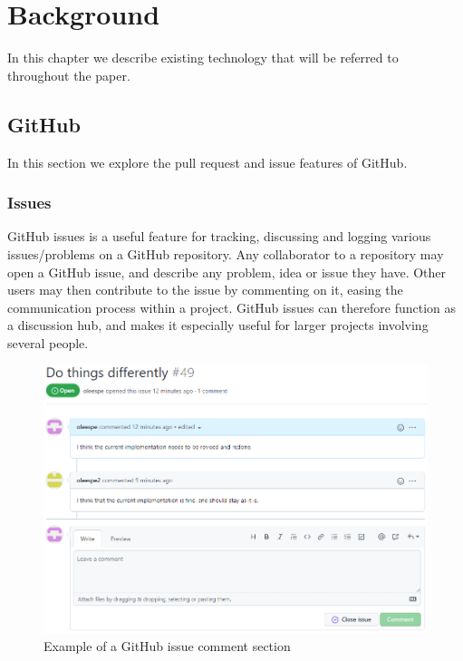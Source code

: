 
\chapter{Background}
\label{ch:background}

In this chapter we describe existing technology that will be referred to throughout the paper.

\section{GitHub}

In this section we explore the pull request and issue features of GitHub.

\subsection{Issues}

GitHub issues is a useful feature for tracking, discussing and logging various issues/problems on a GitHub repository.
Any collaborator to a repository may open a GitHub issue, and describe any problem, idea or issue they have.
Other users may then contribute to the issue by commenting on it, easing the communication process within a project.
GitHub issues can therefore function as a discussion hub, and makes it especially useful for larger projects involving several people. 

\begin{figure}[ht]
    \centering
    \includegraphics[width=\textwidth]{photos/github-issue.PNG}
    \caption{Example of a GitHub issue comment section}
    \label{fig:github-issue}
\end{figure}

